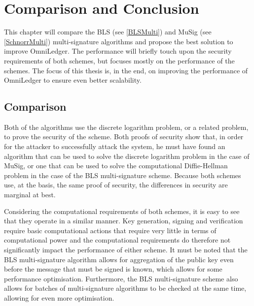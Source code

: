 \chapter{Comparison and Conclusion}
This chapter will compare the BLS (see \ref{BLSMulti}) and MuSig (see \ref{SchnorrMulti}) multi-signature algorithms and propose the best solution to improve OmniLedger. The performance will briefly touch upon the security requirements of both schemes, but focuses mostly on the performance of the schemes. The focus of this thesis is, in the end, on improving the performance of OmniLedger to ensure even better scalability.

\section{Comparison}
Both of the algorithms use the discrete logarithm problem, or a related problem, to prove the security of the scheme. Both proofs of security show that, in order for the attacker to successfully attack the system, he must have found an algorithm that can be used to solve the discrete logarithm problem in the case of MuSig, or one that can be used to solve the computational Diffie-Hellman problem in the case of the BLS multi-signature scheme. Because both schemes use, at the basis, the same proof of security, the differences in security are marginal at best.

Considering the computational requirements of both schemes, it is easy to see that they operate in a similar manner. Key generation, signing and verification require basic computational actions that require very little in terms of computational power and the computational requirements do therefore not significantly impact the performance of either scheme. It must be noted that the BLS multi-signature algorithm allows for aggregation of the public key even before the message that must be signed is known, which allows for some performance optimisation. Furthermore, the BLS multi-signature scheme also allows for batches of multi-signature algorithms to be checked at the same time, allowing for even more optimisation.

